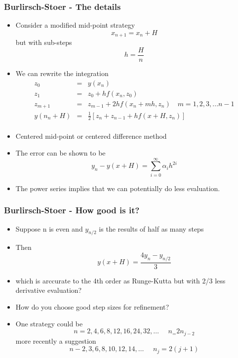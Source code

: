 \documentclass[10pt]{beamer}
\begin{document}
\begin{frame}
  \frametitle{Burlirsch-Stoer - The details}
  \begin{itemize}
  \item Consider a modified mid-point strategy
    \[
      x_{n+1} = x_n + H
    \] but with sub-steps
    \[
      h = \frac{H}{n}
    \]
  \item We can rewrite the integration
    \[
      \begin{array}{rcl}
        z_0 & = & y(x_n)\\
        z_1 & = & z_0 + h f( x_n, z_0 )\\
        z_{m+1} & = & z_{m-1} + 2h f(x_{n} + mh, z_n) \mbox{~~~} m = 1, 2, 3, ...{n-1}\\
        y(n_n + H) & = & \frac{1}{2} [ z_n + z_{n-1} + h f(x+H, z_n) ] \\ 
      \end{array}
    \]
  \item Centered mid-point or centered difference method
  \item The error can be shown to be
    \[
      y_n - y(x+H) = \sum_{i=0}^{\infty} \alpha_i h^{2i}
    \]
  \item The power series implies that we can potentially do less evaluation. 
  \end{itemize}
\end{frame}

\begin{frame}
  \frametitle{Burlirsch-Stoer - How good is it? }
  \begin{itemize}
  \item Suppose n is even and $y_{n/2}$ is the results of half as many steps    
  \item Then
    \[
      y(x+H) = \frac{4 y_n - y_{n/2}}{3}
    \]
  \item which is arccurate to the 4th order as Runge-Kutta but with
    2/3 less derivative evaluation? 
  \item How do you choose good step sizes for refinement? \pause
  \item One strategy could be
    \[
      n = 2, 4, 6, 8, 12, 16, 24, 32, \ldots \mbox{~~~~} n_ = 2 n_{j-2}
    \]
    more recently a suggestion
    \[
      n - 2, 3, 6, 8, 10, 12, 14, \ldots \mbox{~~~~} n_j = 2(j+1)
    \]
  \end{itemize}  
\end{frame}
\end{document}
